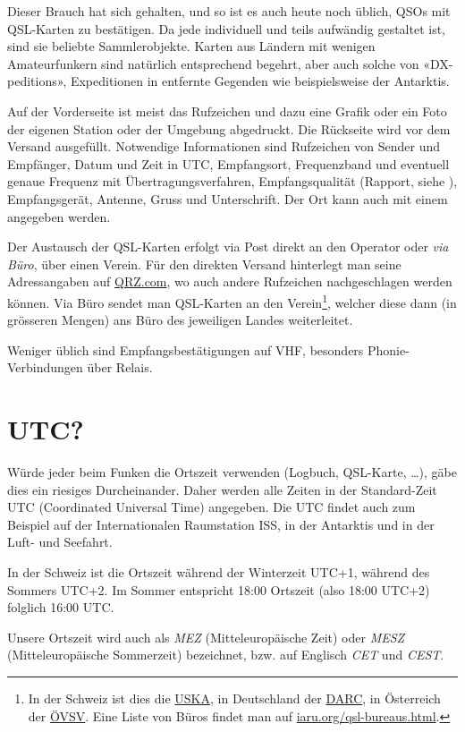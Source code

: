 Dieser Brauch hat sich gehalten, und so ist es auch heute noch üblich, QSOs mit QSL-Karten zu bestätigen. Da jede individuell und teils aufwändig gestaltet ist, sind sie beliebte Sammlerobjekte. Karten aus Ländern mit wenigen Amateurfunkern sind natürlich entsprechend begehrt, aber auch solche von «DX-peditions», Expeditionen in entfernte Gegenden wie beispielsweise der Antarktis. 

Auf der Vorderseite ist meist das Rufzeichen und dazu eine Grafik oder ein Foto der eigenen Station oder der Umgebung abgedruckt. Die Rückseite wird vor dem Versand ausgefüllt. Notwendige Informationen sind Rufzeichen von Sender und Empfänger, Datum und Zeit in UTC, Empfangsort, Frequenzband und eventuell genaue Frequenz mit Übertragungsverfahren, Empfangsqualität (Rapport, siehe ), Empfangsgerät, Antenne, Gruss und Unterschrift. Der Ort kann auch mit einem  angegeben werden.

Der Austausch der QSL-Karten erfolgt via Post direkt an den Operator oder \textit{via Büro}, über einen Verein. Für den direkten Versand hinterlegt man seine Adressangaben auf \href{http://qrz.com}{QRZ.com}, wo auch andere Rufzeichen nachgeschlagen werden können. Via Büro sendet man QSL-Karten an den Verein\footnote{In der Schweiz ist dies die \href{http://uska.ch/mitgliederservice/qsl/}{USKA}, in Deutschland der \href{http://www.darc.de/geschaeftsstelle/qsl-buero/}{DARC}, in Österreich der \href{http://www.oevsv.at/oevsv/referate/referate\_admin/qslvermittlung/}{ÖVSV}. Eine Liste von Büros findet man auf \href{http://www.iaru.org/qsl-bureaus.html}{iaru.org/qsl-bureaus.html}.}, welcher diese dann (in grösseren Mengen) ans Büro des jeweiligen Landes weiterleitet. 

Weniger üblich sind Empfangsbestätigungen auf VHF, besonders Phonie-Verbindungen über Relais.

\section{UTC?}\label{sec:utc}
Würde jeder beim Funken die Ortszeit verwenden (Logbuch, QSL-Karte, …), gäbe dies ein riesiges Durcheinander. Daher werden alle Zeiten in der Standard-Zeit UTC (Coordinated Universal Time) angegeben. Die UTC findet auch zum Beispiel auf der Internationalen Raumstation ISS, in der Antarktis und in der Luft- und Seefahrt.

In der Schweiz ist die Ortszeit während der Winterzeit UTC+1, während des Sommers UTC+2. Im Sommer entspricht 18:00 Ortszeit (also 18:00 UTC+2) folglich 16:00 UTC.

Unsere Ortszeit wird auch als \textit{MEZ} (Mitteleuropäische Zeit) oder \textit{MESZ} (Mitteleuropäische Sommer­zeit) bezeichnet, bzw. auf Englisch \textit{CET} und \textit{CEST}.